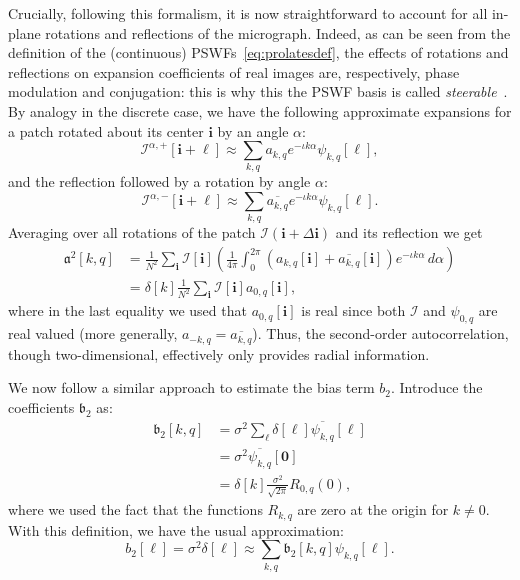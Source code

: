 \documentclass[12pt]{article}
\newcommand{\1}{\mathbf{1}}
\newcommand{\II}{\mathcal{I}}
\newcommand{\mb}{\mathbf}
\newcommand*\Bell{\ensuremath{\boldsymbol\ell}}
\theoremstyle{plain}
\theoremstyle{definition}
\theoremstyle{remark}
\theoremstyle{plain}
\theoremstyle{remark}
\theoremstyle{plain}
\theoremstyle{plain}
\begin{document}
Crucially, following this formalism, it is now straightforward to account for all in-plane rotations and reflections of the micrograph. Indeed, as can be seen from the definition of the (continuous) PSWFs~\eqref{eq:prolatesdef}, the effects of rotations and reflections on expansion coefficients of real images are, respectively, phase modulation and conjugation: this is why this the PSWF basis is called \emph{steerable}~\cite{landa2017steerable,zhao2016fast}. By analogy in the discrete case, we have the following approximate expansions for a patch rotated about its center $\mb i$ by an angle $\alpha$:
\[ \II^{\alpha,+}[\mb i+\Bell] \approx \sum_{k,q}a_{k,q}e^{-\iota k\alpha}\psi_{k,q}[\Bell],\]
and the reflection followed by a rotation by angle $\alpha$:
\[ \II^{\alpha,-}[\mb i+\Bell] \approx \sum_{k,q}\overline{a_{k,q}}e^{-\iota k\alpha}\psi_{k,q}[\Bell].\]
Averaging over all rotations of the patch $\II(\mb i + \Delta\mb i)$ and its reflection we get
\begin{align} \label{eq:second_order_ac_pswf}
\mathfrak{a}^2[k,q] &= \frac{1}{N^2}\sum_{\mb i}\II[\mb i]\left(\frac{1}{4\pi}\int_0^{2\pi}\left(a_{k,q}[\mb i] +
\overline{a_{k,q}}[\mb i]\right)e^{-\iota k\alpha}\, d\alpha\right)\nonumber\\ 
&= \delta[k] \frac{1}{N^2}\sum_{\mb i}\II[\mb i]a_{0,q}[\mb i], 
\end{align}
where in the last equality we used that $a_{0,q}[\mb i]$ is real since both $\II$ and $\psi_{0,q}$ are real valued (more generally, $a_{-k,q}=\overline{a_{k,q}}$).
Thus, the second-order autocorrelation, though two-dimensional, effectively only provides radial information.

We now follow a similar approach to estimate the bias term $b_2$.
Introduce the coefficients $\mathfrak{b}_2$ as:
\[\begin{aligned} 
\mathfrak{b}_2[k,q] & = \sigma^2\sum_{\Bell}\delta[\Bell]\overline{\psi_{k,q}}[\Bell]\\
&= \sigma^2\overline{\psi_{k,q}}[\mb 0]\\
&= \delta[k] \frac{\sigma^2}{\sqrt{2\pi}}R_{0,q}(0), \end{aligned}\]
where we used the fact that the functions $R_{k,q}$ are zero at the origin for $k\neq 0$.
With this definition, we have the usual approximation:
\[ b_2[\Bell] = \sigma^2\delta[\Bell] \approx \sum_{k,q}\mathfrak{b}_2[k,q]\psi_{k,q}[\Bell].\]
\end{document}
